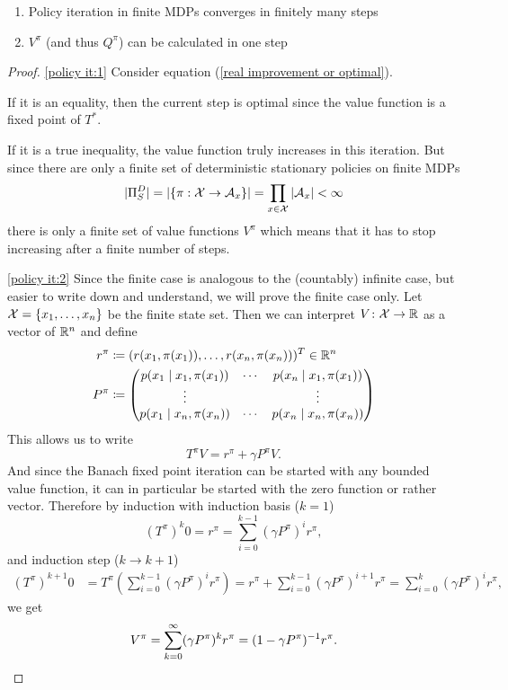 \begin{corollary}\leavevmode
	\begin{enumerate}[label=(\roman*), font=\normalfont]
		\item\label{policy it:1} Policy iteration in finite MDPs converges in finitely many steps
		\item\label{policy it:2} \(V^\pi\) (and thus \(Q^\pi\)) can be calculated in one step 
   \end{enumerate}
\end{corollary}
\begin{proof}
	\ref{policy it:1} \parencite{szepesvariAlgorithmsReinforcementLearning2010} Consider equation (\ref{real improvement or optimal}). 
	
	If it is an equality, then the current step is optimal since the value function is a fixed point of \(T^*\). 
	
	If it is a true inequality, the value function truly increases in this iteration. 
	But since there are only a finite set of deterministic stationary policies on finite MDPs
	\[
		|\Pi_S^D| = |\{\pi:\mathcal{X}\to \mathcal{A}_x\}| = \prod_{x\in\mathcal{X}} |\mathcal{A}_x | < \infty
	\]
	there is only a finite set of value functions \(V^\pi\) which means that it has to stop increasing after a finite number of steps. 

	\ref{policy it:2} Since the finite case is analogous to the (countably) infinite case, but easier to write down and understand, we will prove the finite case only. Let \(\mathcal{X} = \{x_1,\dots,x_n\}\) be the finite state set. Then we can interpret \(V\colon \mathcal{X}\to \mathbb{R}\) as a vector of \(\mathbb{R}^n\) and define
 	\begin{align*}
		r^\pi &\coloneqq (r(x_1,\pi(x_1)),\dots, r(x_n,\pi(x_n)))^T \in \mathbb{R}^n\\
		P^\pi &\coloneqq 
		\begin{pmatrix}
			p(x_1 \mid x_1,\pi(x_1)) & \cdots & p(x_n \mid x_1, \pi(x_1))\\
			\vdots & & \vdots\\
			p(x_1 \mid x_n,\pi(x_n)) & \cdots & p(x_n \mid x_n, \pi(x_n))
		\end{pmatrix}
	\end{align*}
	This allows us to write
	\[
		   T^\pi V= r^\pi +\gamma P^\pi V.
	\]
	And since the Banach fixed point iteration can be started with any bounded value function, it can in particular be started with the zero function or rather vector. Therefore by induction with induction basis (\(k=1\))
	\[
		(T^\pi)^k 0 = r^\pi = \sum_{i=0}^{k-1} (\gamma P^\pi)^i r^\pi,
	\]
	and induction step (\(k\to k+1\))
	\begin{align*}
		(T^\pi)^{k+1} 0 &= T^\pi \left(\sum_{i=0}^{k-1} (\gamma P^\pi)^i r^{\pi}\right)
		= r^\pi + \sum_{i=0}^{k-1} (\gamma P^\pi)^{i+1} r^\pi
		= \sum_{i=0}^{k} (\gamma P^\pi)^{i} r^\pi,
	\end{align*}
	we get
	\[
		V^\pi = \sum_{k=0}^\infty (\gamma P^\pi)^k r^\pi = (1-\gamma P^\pi)^{-1} r^\pi. \qedhere
	\]
\end{proof}

